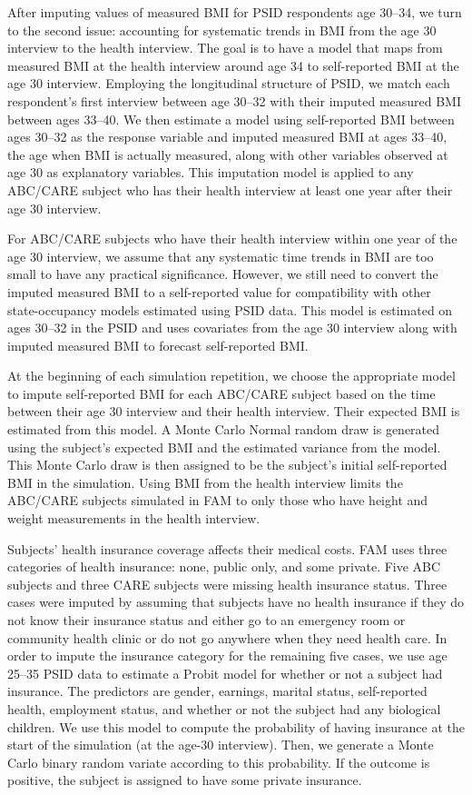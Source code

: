 \noindent After imputing values of measured BMI for PSID respondents age 30--34, we turn to the second issue: accounting for systematic trends in BMI from the age 30 interview to the health interview. The goal is to have a model that maps from measured BMI at the health interview around age 34 to self-reported BMI at the age 30 interview. Employing the longitudinal structure of PSID, we match each respondent's first interview between age 30--32 with their imputed measured BMI between ages 33--40. We then estimate a model using self-reported BMI between ages 30--32 as the response variable and imputed measured BMI at ages 33--40, the age when BMI is actually measured, along with other variables observed at age 30 as explanatory variables. This imputation model is applied to any ABC/CARE subject who has their health interview at least one year after their age 30 interview.

\noindent For ABC/CARE subjects who have their health interview within one year of the age 30 interview, we assume that any systematic time trends in BMI are too small to have any practical significance. However, we still need to convert the imputed measured BMI to a self-reported value for compatibility with other state-occupancy models estimated using PSID data. This model is estimated on ages 30--32 in the PSID and uses covariates from the age 30 interview along with imputed measured BMI to forecast self-reported BMI.

\noindent At the beginning of each simulation repetition, we choose the appropriate model to impute self-reported BMI for each ABC/CARE subject based on the time between their age 30 interview and their health interview. Their expected BMI is estimated from this model. A Monte Carlo Normal random draw is generated using the subject's expected BMI and the estimated variance from the model. This Monte Carlo draw is then assigned to be the subject's initial self-reported BMI in the simulation. Using BMI from the health interview limits the ABC/CARE subjects simulated in FAM to only those who have height and weight measurements in the health interview.

\noindent Subjects' health insurance coverage affects their medical costs.
FAM uses three categories of health insurance: none, public only, and some private.
Five ABC subjects and three CARE subjects were missing health insurance status.
Three cases were imputed by assuming that subjects have no health insurance if they do not know their insurance status and either go to an emergency room or community health clinic or do not go anywhere when they need health care.
In order to impute the insurance category for the remaining five cases, we use age 25--35 PSID data to estimate a Probit model for whether or not a subject had insurance.
The predictors are gender, earnings, marital status, self-reported health, employment status, and whether or not the subject had any biological children.
We use this model to compute the probability of having insurance at the start of the simulation (at the age-30 interview).
Then, we generate a Monte Carlo binary random variate according to this probability.
If the outcome is positive, the subject is assigned to have some private insurance.


